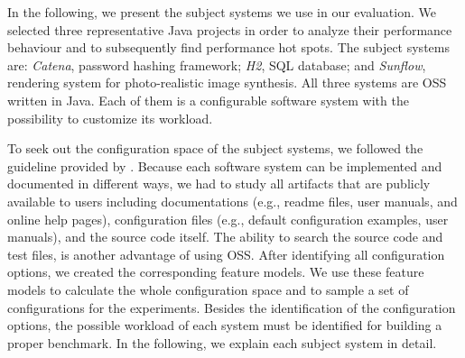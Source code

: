In the following, we present the subject systems we use in our evaluation. We selected three representative Java projects in order to analyze their performance behaviour and to subsequently find performance hot spots. The subject systems are: \textit{Catena}, password hashing framework; \textit{H2}, SQL database; and \textit{Sunflow}, rendering system for photo-realistic image synthesis. All three systems are \ac{OSS} written in Java. Each of them is a configurable software system with the possibility to customize its workload. 

To seek out the configuration space of the subject systems, we followed the guideline provided by \cite{Han:2016:ESP:2961111.2962602}. Because each software system can be implemented and documented in different ways, we had to study all artifacts that are publicly available to users including documentations (e.g., readme files, user manuals, and online help pages), configuration files (e.g., default configuration examples, user manuals), and the source code itself. The ability to search the source code and test files, is another advantage of using \ac{OSS}. After identifying all configuration options, we created the corresponding feature models. We use these feature models to calculate the whole configuration space and to sample a set of configurations for the experiments. Besides the identification of the configuration options, the possible workload of each system must be identified for building a proper benchmark. In the following, we explain each subject system in detail.



% 

